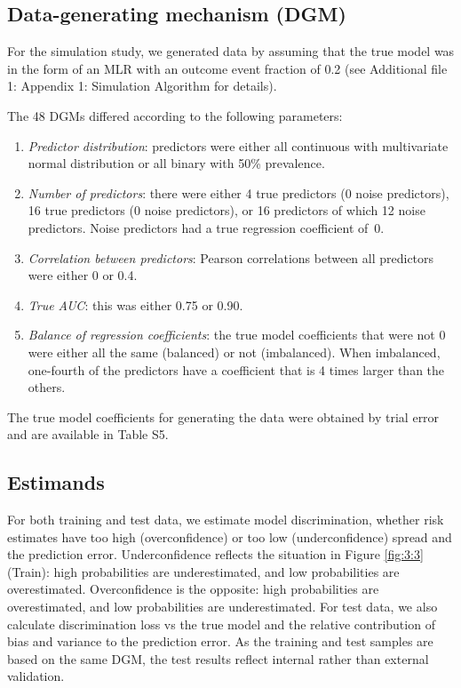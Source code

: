 \subsection{Data-generating mechanism (DGM)}
For the simulation study, we generated data by assuming that the true model was
in the form of an \gls{MLR} with an outcome event fraction of 0.2 (see Additional
file 1: Appendix 1: Simulation Algorithm for details).

The 48 \glspl{DGM} differed according to the following parameters:
\begin{enumerate}[label=(\roman*)]
\item \textit{Predictor distribution}: predictors were either all continuous
with multivariate normal distribution or all binary with 50\% prevalence.
\item \textit{Number of predictors}: there were either 4 true predictors (0
noise predictors), 16 true predictors (0 noise predictors), or 16 predictors of
which 12 noise predictors. Noise predictors had a true regression coefficient
of~0.
\item \textit{Correlation between predictors}: Pearson correlations between all
predictors were either 0 or 0.4.
\item \textit{True AUC}: this was either 0.75 or 0.90.
\item \textit{Balance of regression coefficients}: the true model coefficients
that were not 0 were either all the same (balanced) or not (imbalanced). When
imbalanced, one-fourth of the predictors have a coefficient that is 4 times
larger than the others.
\end{enumerate}

The true model coefficients for generating the data were obtained by trial error
and are available in Table S5.

\subsection{Estimands}
For both training and test data, we estimate model discrimination, whether risk
estimates have too high (overconfidence) or too low (underconfidence) spread and
the prediction error. Underconfidence reflects the situation in Figure \ref{fig:3:3}
(Train): high probabilities are underestimated, and low probabilities are
overestimated. Overconfidence is the opposite: high probabilities are
overestimated, and low probabilities are underestimated. For test data, we also
calculate discrimination loss vs the true model and the relative contribution of
bias and variance to the prediction error. As the training and test samples are
based on the same \gls{DGM}, the test results reflect internal rather than external
validation.

